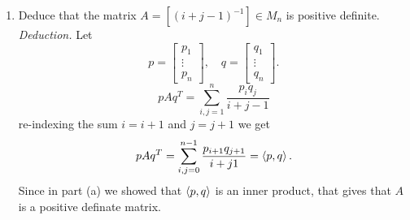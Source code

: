 \documentclass[12pt]{article}
\begin{document}
\begin{enumerate}[label=(\alph*)]
\begin{proof}
\begin{align*}
            &=\sum_{i,j=0}^{n-1}\frac{p_iq_j}{i+j+1}\\
            &=\inner{p}{q}.
        \end{align*}
        Since $\inner{p}{q}_{L^2}$ is an inner product, we have that $\inner{p}{q}$ is positive definate and therefore is an inner product.
    \end{proof}
    \item Deduce that the matrix $A = [(i + j - 1)^{-1}] \in M_n$ is positive definite.\\
    \textit{Deduction.} Let 
    \[
        p=\begin{bmatrix}
            p_1\\\vdots\\p_n
        \end{bmatrix},\quad
        q=\begin{bmatrix}
            q_1\\\vdots\\q_n
        \end{bmatrix}.
    \]
    \[
        pAq^T=\sum_{i,j=1}^{n}\frac{p_iq_j}{i+j-1}
    \]
    re-indexing the sum $i=i+1$ and $j=j+1$ we get
    \[
        pAq^T=\sum_{i,j=0}^{n-1}\frac{p_{i+1}q_{j+1}}{i+j1}=\left\langle p, q \right\rangle.
    \]
    Since in part (a) we showed that $\inner{p}{q}$ is an inner product, that gives that $A$ is a positive definate matrix.
\end{enumerate}
\end{document}
